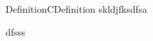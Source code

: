 \documentclass[a4paper]{memoir}
\begin{document}
\pagecolor{White}
\color{Black}
\begin{ibox}[]{Definition}{CDefinition}
    skldjfksdfsa
\end{ibox}
	
dfsss
\end{document}
